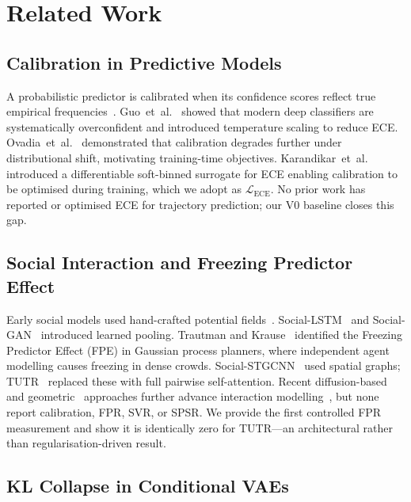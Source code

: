 \documentclass[journal]{IEEEtran}
\makeatletter
\newcommand{\etal}{et~al.\@}
\makeatother
\begin{document}
\section{Related Work}
\label{sec:related}

\subsection{Calibration in Predictive Models}

A probabilistic predictor is calibrated when its confidence scores
reflect true empirical frequencies~\cite{guo2017calibration,niculescu2005predicting}.
Guo~\etal~\cite{guo2017calibration} showed that modern deep classifiers
are systematically overconfident and introduced temperature scaling to
reduce ECE.
Ovadia~\etal~\cite{ovadia2019can} demonstrated that calibration degrades
further under distributional shift, motivating training-time objectives.
Karandikar~\etal~\cite{karandikar2021soft} introduced a differentiable
soft-binned surrogate for ECE enabling calibration to be optimised
during training, which we adopt as \(\mathcal{L}_{\text{ECE}}\).
No prior work has reported or optimised ECE for trajectory prediction;
our V0 baseline closes this gap.

\subsection{Social Interaction and Freezing Predictor Effect}

Early social models used hand-crafted potential
fields~\cite{helbing1995social}.
Social-LSTM~\cite{alahi2016social} and
Social-GAN~\cite{gupta2018social} introduced learned pooling.
Trautman and Krause~\cite{trautman2010unfreezing} identified the
Freezing Predictor Effect (FPE) in Gaussian process planners, where
independent agent modelling causes freezing in dense crowds.
Social-STGCNN~\cite{mohamed2020social} used spatial graphs;
TUTR~\cite{shi2023tutr} replaced these with full pairwise
self-attention.
Recent diffusion-based~\cite{liu2024diftraj} and
geometric~\cite{wong2024socialcircle} approaches further advance
interaction modelling~\cite{bae2024singular}, but none report
calibration, FPR, SVR, or SPSR.
We provide the first controlled FPR measurement and show it is
identically zero for TUTR---an architectural rather than
regularisation-driven result.

\subsection{KL Collapse in Conditional VAEs}
\end{document}
